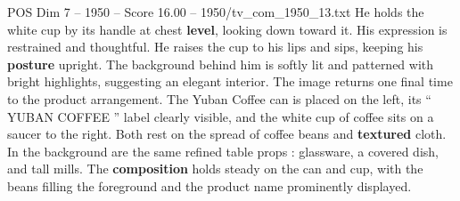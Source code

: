 \begin{textsample}{POS Dim 7 – 1950 – Score 16.00 – 1950/tv\_com\_1950\_13.txt}
He holds the white cup by its handle at chest \textbf{level}, looking down toward it.
His expression is restrained and thoughtful.
He raises the cup to his lips and sips, keeping his \textbf{posture} upright.
The background behind him is softly lit and patterned with bright highlights, suggesting an elegant interior.
The image returns one final time to the product arrangement.
The Yuban Coffee can is placed on the left, its “ YUBAN COFFEE ” label clearly visible, and the white cup of coffee sits on a saucer to the right.
Both rest on the spread of coffee beans and \textbf{textured} cloth.
In the background are the same refined table props : glassware, a covered dish, and tall mills.
The \textbf{composition} holds steady on the can and cup, with the beans filling the foreground and the product name prominently displayed.

\end{textsample}
